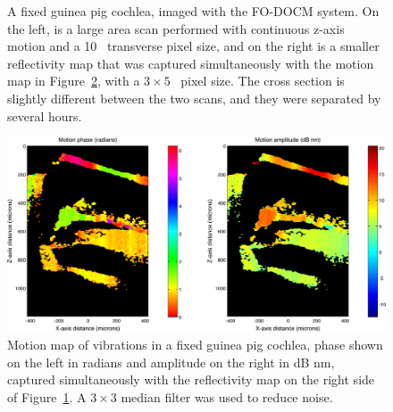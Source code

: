 \begin{figure}[h!]
\centering
{}
\caption[A fixed guinea pig cochlea, imaged with the FO-DOCM system.]{A fixed guinea pig cochlea, imaged with the FO-DOCM system. On the left, is a large area scan performed with continuous z-axis motion and a 10 \micron~transverse pixel size, and on the right is a smaller reflectivity map that was captured simultaneously with the motion map in Figure~\ref{fig:motion_map}, with a $3\times5$ \micron~pixel size. The cross section is slightly different between the two scans, and they were separated by several hours. \label{fig:fixed_refl}}
\end{figure}

\begin{figure}[h!]
\centering
\includegraphics[width=1.03\textwidth]{Images/Results/4-29/motion.png}
\caption[Motion map of vibrations in a fixed guinea pig cochlea.]{Motion map of vibrations in a fixed guinea pig cochlea, phase shown on the left in radians and amplitude on the right in dB nm, captured simultaneously with the reflectivity map on the right side of Figure~\ref{fig:fixed_refl}. A $3\times3$ median filter was used to reduce noise. \label{fig:motion_map}}
\end{figure}


